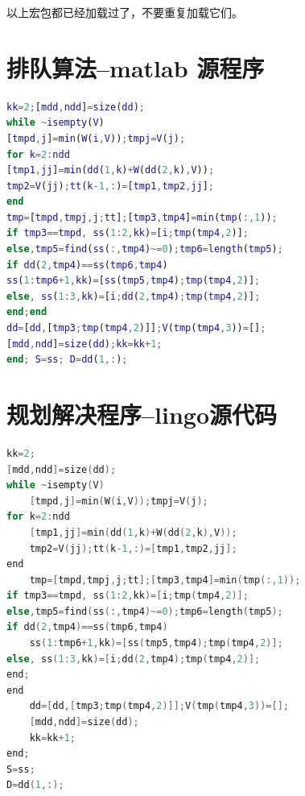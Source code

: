 \documentclass[withoutpreface,bwprint]{cumcmthesis} %
\begin{document}
\begin{appendices}
以上宏包都已经加载过了，不要重复加载它们。

\section{排队算法--matlab 源程序}

\begin{lstlisting}[language=matlab]
kk=2;[mdd,ndd]=size(dd);
while ~isempty(V)
[tmpd,j]=min(W(i,V));tmpj=V(j);
for k=2:ndd
[tmp1,jj]=min(dd(1,k)+W(dd(2,k),V));
tmp2=V(jj);tt(k-1,:)=[tmp1,tmp2,jj];
end
tmp=[tmpd,tmpj,j;tt];[tmp3,tmp4]=min(tmp(:,1));
if tmp3==tmpd, ss(1:2,kk)=[i;tmp(tmp4,2)];
else,tmp5=find(ss(:,tmp4)~=0);tmp6=length(tmp5);
if dd(2,tmp4)==ss(tmp6,tmp4)
ss(1:tmp6+1,kk)=[ss(tmp5,tmp4);tmp(tmp4,2)];
else, ss(1:3,kk)=[i;dd(2,tmp4);tmp(tmp4,2)];
end;end
dd=[dd,[tmp3;tmp(tmp4,2)]];V(tmp(tmp4,3))=[];
[mdd,ndd]=size(dd);kk=kk+1;
end; S=ss; D=dd(1,:);
 \end{lstlisting}

 \section{规划解决程序--lingo源代码}

\begin{lstlisting}[language=c]
kk=2;
[mdd,ndd]=size(dd);
while ~isempty(V)
    [tmpd,j]=min(W(i,V));tmpj=V(j);
for k=2:ndd
    [tmp1,jj]=min(dd(1,k)+W(dd(2,k),V));
    tmp2=V(jj);tt(k-1,:)=[tmp1,tmp2,jj];
end
    tmp=[tmpd,tmpj,j;tt];[tmp3,tmp4]=min(tmp(:,1));
if tmp3==tmpd, ss(1:2,kk)=[i;tmp(tmp4,2)];
else,tmp5=find(ss(:,tmp4)~=0);tmp6=length(tmp5);
if dd(2,tmp4)==ss(tmp6,tmp4)
    ss(1:tmp6+1,kk)=[ss(tmp5,tmp4);tmp(tmp4,2)];
else, ss(1:3,kk)=[i;dd(2,tmp4);tmp(tmp4,2)];
end;
end
    dd=[dd,[tmp3;tmp(tmp4,2)]];V(tmp(tmp4,3))=[];
    [mdd,ndd]=size(dd);
    kk=kk+1;
end;
S=ss;
D=dd(1,:);
 \end{lstlisting}
\end{appendices}
\end{document}
